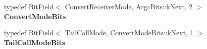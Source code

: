 \begin{DoxyCompactItemize}
\item 
typedef \hyperlink{classv8_1_1internal_1_1_bit_field}{Bit\+Field}$<$ Convert\+Receiver\+Mode, Argc\+Bits\+::k\+Next, 2 $>$ {\bfseries Convert\+Mode\+Bits}\hypertarget{classv8_1_1internal_1_1_b_a_s_e___e_m_b_e_d_d_e_d_a5d7bd26f685c171d09ae428386aede5a}{}\label{classv8_1_1internal_1_1_b_a_s_e___e_m_b_e_d_d_e_d_a5d7bd26f685c171d09ae428386aede5a}

\item 
typedef \hyperlink{classv8_1_1internal_1_1_bit_field}{Bit\+Field}$<$ Tail\+Call\+Mode, Convert\+Mode\+Bits\+::k\+Next, 1 $>$ {\bfseries Tail\+Call\+Mode\+Bits}\hypertarget{classv8_1_1internal_1_1_b_a_s_e___e_m_b_e_d_d_e_d_a83301cf41ca9bc747f47f530559f8b52}{}\label{classv8_1_1internal_1_1_b_a_s_e___e_m_b_e_d_d_e_d_a83301cf41ca9bc747f47f530559f8b52}

\end{DoxyCompactItemize}
